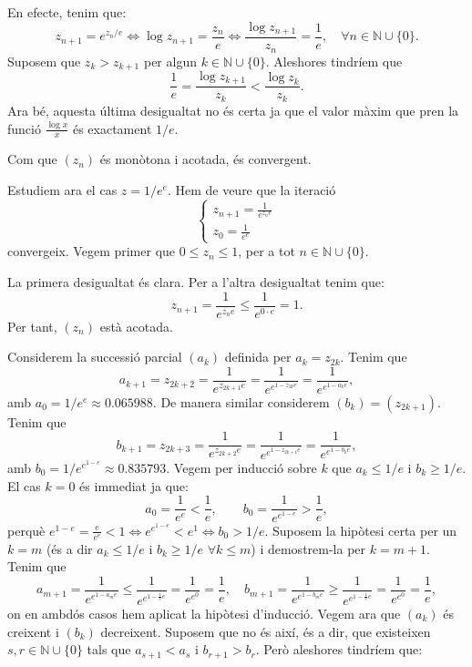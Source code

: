 \documentclass[11pt,a4paper]{article}
\theoremstyle{definition}
\begin{document}
En efecte, tenim que: $$z_{n+1}=e^{z_n/e}\iff\log z_{n+1}=\frac{z_n}{e}\iff\frac{\log z_{n+1}}{z_n}=\frac{1}{e},\quad\forall n\in\mathbb{N}\cup\{0\}.$$ Suposem que $z_k>z_{k+1}$ per algun $k\in\mathbb{N}\cup\{0\}$. Aleshores tindríem que $$\frac{1}{e}=\frac{\log z_{k+1}}{z_k}<\frac{\log z_k}{z_k}.$$ Ara bé, aquesta última desigualtat no és certa ja que el valor màxim que pren la funció $\frac{\log x}{x}$ és exactament $1/e$.\par
Com que $(z_n)$ és monòtona i acotada, és convergent.\par
Estudiem ara el cas $z=1/e^e$. Hem de veure que la iteració
$$\left\{\begin{array}{l}
        z_{n+1}=\frac{1}{e^{z_ne}} \\
        z_0=\frac{1}{e^e}
    \end{array}\right.$$
convergeix. Vegem primer que $0\leq z_n\leq 1$, per a tot $n\in\mathbb{N}\cup\{0\}$.\par
La primera desigualtat és clara. Per a l'altra desigualtat tenim que: $$z_{n+1}=\frac{1}{e^{z_ne}}\leq\frac{1}{e^{0\cdot e}}=1.$$ Per tant, $(z_n)$ està acotada.\par
Considerem la successió parcial $(a_k)$ definida per $a_k=z_{2k}$. Tenim que \begin{equation}
    a_{k+1}=z_{2k+2}=\frac{1}{e^{z_{2k+1}e}}=\frac{1}{e^{e^{1-z_{2k}e}}}=\frac{1}{e^{e^{1-a_ke}}},
    \label{parells}
\end{equation} amb $a_0=1/e^e\approx0.065988$. De manera similar considerem $(b_k)=(z_{2k+1})$. Tenim que
\begin{equation}
    b_{k+1}=z_{2k+3}=\frac{1}{e^{z_{2k+2}e}}=\frac{1}{e^{e^{1-z_{2k+1}e}}}=\frac{1}{e^{e^{1-b_ke}}},
    \label{senars}
\end{equation} amb $b_0=1/e^{e^{1-e}}\approx0.835793$.
Vegem per inducció sobre $k$ que $a_k\leq 1/e$ i $b_k\geq 1/e$. El cas $k=0$ és immediat ja que: $$a_0=\frac{1}{e^e}<\frac{1}{e},\qquad b_0=\frac{1}{e^{e^{1-e}}}>\frac{1}{e},$$ perquè $e^{1-e}=\frac{e}{e^e}<1\iff e^{e^{1-e}}<e^1\iff b_0>1/e$. Suposem la hipòtesi certa per un $k=m$ (és a dir $a_k\leq 1/e$ i $b_k\geq 1/e$ $\forall k\leq m$) i demostrem-la per $k=m+1$. Tenim que $$a_{m+1}=\frac{1}{e^{e^{1-a_me}}}\leq\frac{1}{e^{e^{1-\frac{1}{e}e}}}=\frac{1}{e^{e^0}}=\frac{1}{e},\quad b_{m+1}=\frac{1}{e^{e^{1-b_me}}}\geq\frac{1}{e^{e^{1-\frac{1}{e}e}}}=\frac{1}{e^{e^0}}=\frac{1}{e},$$ on en ambdós casos hem aplicat la hipòtesi d'inducció.
Vegem ara que $(a_k)$ és creixent i $(b_k)$ decreixent. Suposem que no és així, és a dir, que existeixen $s,r\in\mathbb{N}\cup\{0\}$ tals que $a_{s+1}<a_s$ i $b_{r+1}>b_r$. Però aleshores tindríem que:
\end{document}
